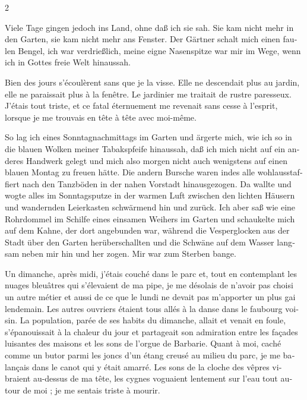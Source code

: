 \documentclass[a4paper,11pt]{article}
\newcommand\chunks[2]{%
\begin{leftcolumn*}\begin{otherlanguage}{german}%
{#1}%
\end{otherlanguage}\end{leftcolumn*}%
\begin{rightcolumn}\begin{otherlanguage}{french}%
{#2}%
\end{otherlanguage}\end{rightcolumn}%
}
\begin{document}
\begin{paracol}{2}
  \chunks{Viele Tage gingen jedoch ins Land, ohne daß ich sie sah. Sie kam nicht mehr in den Garten, sie kam nicht mehr ans Fenster. Der Gärtner schalt mich einen faulen Bengel, ich war verdrießlich, meine eigne Nasenspitze war mir im Wege, wenn ich in Gottes freie Welt hinaussah.}
         {Bien des jours s’écoulèrent sans que je la visse. Elle ne descendait plus au jardin, elle ne paraissait plus à la fenêtre. Le jardinier me traitait de rustre paresseux. J’étais tout triste, et ce fatal éternuement me revenait sans cesse à l’esprit, lorsque je me trouvais en tête à tête avec moi-même.}
  \chunks{So lag ich eines Sonntagnachmittags im Garten und ärgerte mich, wie ich so in die blauen Wolken meiner Tabakspfeife hinaussah, daß ich mich nicht auf ein anderes Handwerk gelegt und mich also morgen nicht auch wenigstens auf einen blauen Montag zu freuen hätte. Die andern Bursche waren indes alle wohlausstaffiert nach den Tanzböden in der nahen Vorstadt hinausgezogen. Da wallte und wogte alles im Sonntagsputze in der warmen Luft zwischen den lichten Häusern und wandernden Leierkasten schwärmend hin und zurück. Ich aber saß wie eine Rohrdommel im Schilfe eines einsamen Weihers im Garten und schaukelte mich auf dem Kahne, der dort angebunden war, während die Vesperglocken aus der Stadt über den Garten herüberschallten und die Schwäne auf dem Wasser langsam neben mir hin und her zogen. Mir war zum Sterben bange.}
         {Un dimanche, après midi, j’étais couché dans le parc et, tout en contemplant les nuages bleuâtres qui s’élevaient de ma pipe, je me désolais de n’avoir pas choisi un autre métier et aussi de ce que le lundi ne devait pas m’apporter un plus gai lendemain. Les autres ouvriers étaient tous allés à la danse dans le faubourg voisin. La population, parée de ses habits du dimanche, allait et venait en foule, s’épanouissait à la chaleur du jour et partageait son admiration entre les façades luisantes des maisons et les sons de l’orgue de Barbarie. Quant à moi, caché comme un butor parmi les joncs d’un étang creusé au milieu du parc, je me balançais dans le canot qui y était amarré. Les sons de la cloche des vêpres vibraient au-dessus de ma tête, les cygnes voguaient lentement sur l’eau tout autour de moi ; je me sentais triste à mourir.}

\end{paracol}
\end{document}

